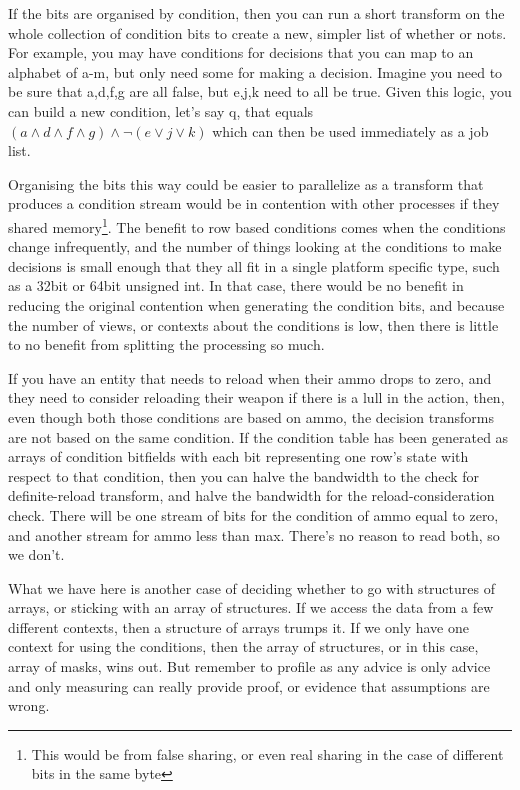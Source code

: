 If the bits are organised by condition, then you can run a short transform on
the whole collection of condition bits to create a new, simpler list of whether
or nots. For example, you may have conditions for decisions that you can map to
an alphabet of a-m, but only need some for making a decision. Imagine you need
to be sure that a,d,f,g are all false, but e,j,k need to all be true. Given
this logic, you can build a new condition, let's say q, that equals $( a \wedge
d \wedge f \wedge g ) \wedge \neg( e \vee j \vee k )$ which can then be used
immediately as a job list.

Organising the bits this way could be easier to parallelize as a transform that
produces a condition stream would be in contention with other processes if they
shared memory\footnote{This would be from false sharing, or even real sharing in
the case of different bits in the same byte}. The benefit to row based conditions
comes when the conditions change infrequently, and the number of things looking
at the conditions to make decisions is small enough that they all fit in a single
platform specific type, such as a 32bit or 64bit unsigned int. In that case, there
would be no benefit in reducing the original contention when generating the condition
bits, and because the number of views, or contexts about the conditions is low, then
there is little to no benefit from splitting the processing so much.

If you have an entity that needs to reload when their ammo drops to zero,
and they need to consider reloading their weapon if there is a lull in the
action, then, even though both those conditions are based on ammo, the decision
transforms are not based on the same condition. If the condition table has been
generated as arrays of condition bitfields with each bit representing one row's
state with respect to that condition, then you can halve the bandwidth to the
check for definite-reload transform, and halve the bandwidth for the
reload-consideration check. There will be one stream of bits for the condition
of ammo equal to zero, and another stream for ammo less than max. There's no
reason to read both, so we don't.

What we have here is another case of deciding whether to go with structures of
arrays, or sticking with an array of structures.  If we access the data from a
few different contexts, then a structure of arrays trumps it. If we only have
one context for using the conditions, then the array of structures, or in this
case, array of masks, wins out. But remember to profile as any advice is only
advice and only measuring can really provide proof, or evidence that
assumptions are wrong.

